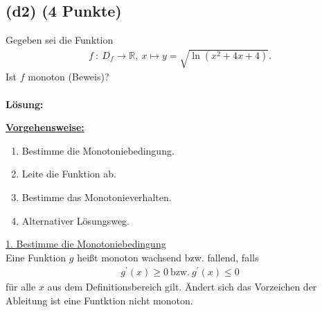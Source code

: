 \subsection*{(d2) (4 Punkte)}
Gegeben sei die Funktion
\begin{align*}
f \ : \ D_f \to \mathbb{R}, \ x \mapsto y = \sqrt{\ln(x^2 +4x +4)}. 
\end{align*}
Ist $f$ monoton (Beweis)?
\\
\\
\textbf{Lösung:}
\begin{mdframed}
\underline{\textbf{Vorgehensweise:}}
\begin{enumerate}
\item Bestimme die Monotoniebedingung.
\item Leite die Funktion ab.
\item Bestimme das Monotonieverhalten.
\item Alternativer Lösungsweg. 
\end{enumerate}
\end{mdframed}

\underline{1. Bestimme die Monotoniebedingung}\\
Eine Funktion $g$ heißt monoton wachsend bzw. fallend, falls
\begin{align*}
g^\prime(x) \geq 0 \ \text{bzw.} \ g^\prime(x) \leq 0  
\end{align*}
für alle $x$ aus dem Definitionsbereich gilt. Ändert sich das Vorzeichen der Ableitung ist eine Funtktion nicht monoton.
\\

